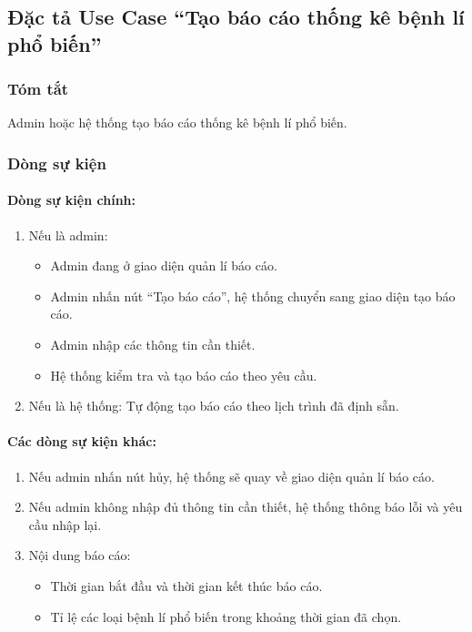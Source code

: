 \subsection{Đặc tả Use Case ``Tạo báo cáo thống kê bệnh lí phổ biến''}

\subsubsection{Tóm tắt}
Admin hoặc hệ thống tạo báo cáo thống kê bệnh lí phổ biến.

\subsubsection{Dòng sự kiện}
\paragraph{\textbf{Dòng sự kiện chính:}}
\begin{enumerate}
  \item Nếu là admin:
  \begin{itemize}
    \item Admin đang ở giao diện quản lí báo cáo.
    \item Admin nhấn nút ``Tạo báo cáo'', hệ thống chuyển sang giao diện tạo báo cáo.
    \item Admin nhập các thông tin cần thiết.
    \item Hệ thống kiểm tra và tạo báo cáo theo yêu cầu.
  \end{itemize}
  \item Nếu là hệ thống: Tự động tạo báo cáo theo lịch trình đã định sẵn.
\end{enumerate}

\paragraph{\textbf{Các dòng sự kiện khác:}}
\begin{enumerate}
  \item Nếu admin nhấn nút hủy, hệ thống sẽ quay về giao diện quản lí báo cáo.
  \item Nếu admin không nhập đủ thông tin cần thiết, hệ thống thông báo lỗi và yêu cầu nhập lại.
  \item Nội dung báo cáo:
  \begin{itemize}
    \item Thời gian bắt đầu và thời gian kết thúc báo cáo.
    \item Tỉ lệ các loại bệnh lí phổ biến trong khoảng thời gian đã chọn.
  \end{itemize}
\end{enumerate}

